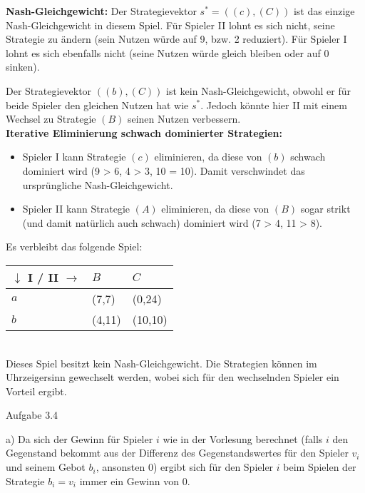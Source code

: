 \documentclass{scrartcl}
\begin{document}
\textbf{Nash-Gleichgewicht: }Der Strategievektor $s^* = ((c),(C))$ ist das einzige Nash-Gleichgewicht 
in diesem Spiel. Für Spieler II lohnt es sich nicht, seine Strategie zu ändern (sein Nutzen würde auf
9, bzw. 2 reduziert). Für Spieler I lohnt es sich ebenfalls nicht (seine Nutzen würde gleich bleiben
oder auf 0 sinken).

Der Strategievektor $((b), (C))$ ist kein Nash-Gleichgewicht, obwohl er für beide Spieler den gleichen
Nutzen hat wie $s^*$. Jedoch könnte hier II mit einem Wechsel zu Strategie $(B)$ seinen Nutzen
verbessern. \\

\textbf{Iterative Eliminierung schwach dominierter Strategien: }

\begin{itemize}
\item{Spieler I kann Strategie $(c)$ eliminieren, da diese von $(b)$ schwach dominiert wird (9 > 6,
4 > 3, 10 = 10). Damit verschwindet das ursprüngliche Nash-Gleichgewicht.}
\item{Spieler II kann Strategie $(A)$ eliminieren, da diese von $(B)$ sogar strikt (und damit natürlich
auch schwach) dominiert wird (7 > 4, 11 > 8).}
\end{itemize}

Es verbleibt das folgende Spiel: \\

\begin{tabularx}{0.5\textwidth} {|X|X|X|}
\hline
$\downarrow$ I / II $\rightarrow$	& $B$		& $C$	\\
\hline
$a$									& (7,7)		& (0,24)\\
\hline
$b$									& (4,11)	& (10,10)\\
\hline
\end{tabularx} \\

Dieses Spiel besitzt kein Nash-Gleichgewicht. Die Strategien können im Uhrzeigersinn gewechselt werden,
wobei sich für den wechselnden Spieler ein Vorteil ergibt. \\

\begin{Large}
Aufgabe 3.4\\[0.0cm]
\end{Large}

a) Da sich der Gewinn für Spieler $i$ wie in der Vorlesung berechnet (falls $i$ den Gegenstand
bekommt aus der Differenz des Gegenstandswertes für den Spieler $v_i$ und seinem Gebot $b_i$,
ansonsten 0) ergibt sich für den Spieler $i$ beim Spielen der Strategie $b_i = v_i$ immer ein Gewinn 
von 0.
\end{document}
